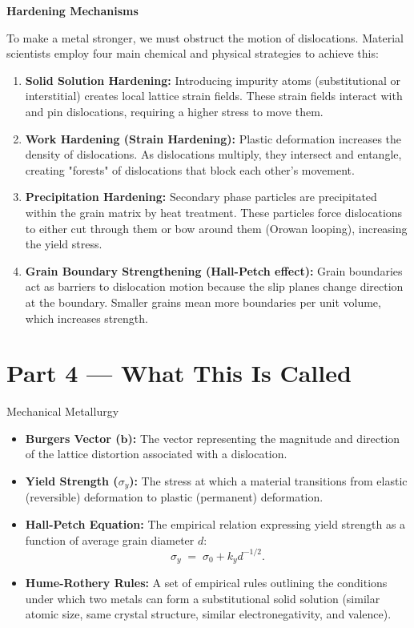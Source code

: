\documentclass[12pt, a4paper]{book}
\newcommand{\important}[1]{\textcolor{ModuleColor}{\textbf{#1}}}
\begin{document}
\begin{discoverybox}
\textbf{Hardening Mechanisms}

To make a metal stronger, we must obstruct the motion of dislocations. Material scientists employ four main chemical and physical strategies to achieve this:

\begin{enumerate}
  \item \important{Solid Solution Hardening:} Introducing impurity atoms (substitutional or interstitial) creates local lattice strain fields. These strain fields interact with and pin dislocations, requiring a higher stress to move them.
  \item \important{Work Hardening (Strain Hardening):} Plastic deformation increases the density of dislocations. As dislocations multiply, they intersect and entangle, creating "forests" of dislocations that block each other's movement.
  \item \important{Precipitation Hardening:} Secondary phase particles are precipitated within the grain matrix by heat treatment. These particles force dislocations to either cut through them or bow around them (Orowan looping), increasing the yield stress.
  \item \important{Grain Boundary Strengthening (Hall-Petch effect):} Grain boundaries act as barriers to dislocation motion because the slip planes change direction at the boundary. Smaller grains mean more boundaries per unit volume, which increases strength.
\end{enumerate}
\end{discoverybox}

\newpage

\section{Part 4 --- What This Is Called}

\begin{namedconcept}{Mechanical Metallurgy}
\begin{itemize}
  \item \important{Burgers Vector ($\mathbf{b}$):} The vector representing the magnitude and direction of the lattice distortion associated with a dislocation.
  \item \important{Yield Strength ($\sigma_y$):} The stress at which a material transitions from elastic (reversible) deformation to plastic (permanent) deformation.
  \item \important{Hall-Petch Equation:} The empirical relation expressing yield strength as a function of average grain diameter $d$:
        \[
          \sigma_y \;=\; \sigma_0 + k_y d^{-1/2}.
        \]
  \item \important{Hume-Rothery Rules:} A set of empirical rules outlining the conditions under which two metals can form a substitutional solid solution (similar atomic size, same crystal structure, similar electronegativity, and valence).
\end{itemize}
\end{namedconcept}
\end{document}
